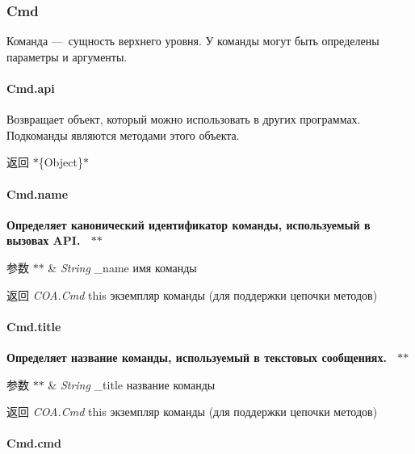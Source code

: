 \subsubsection*{Cmd}

Команда — сущность верхнего уровня. У команды могут быть определены параметры и аргументы.

\paragraph*{Cmd.\+api}

Возвращает объект, который можно использовать в других программах. Подкоманды являются методами этого объекта.~\newline
 {\bfseries \begin{DoxyReturn}{返回}
$\ast$\{Object\}$\ast$
\end{DoxyReturn}
\paragraph*{Cmd.\+name}}

{\bfseries  Определяет канонический идентификатор команды, используемый в вызовах A\+PI.~\newline
 $\ast$$\ast$
\begin{DoxyParams}{参数}
{\em $\ast$$\ast$} & {\itshape String} {\ttfamily \+\_\+name} имя команды~\newline
 {\bfseries }\\
\hline
\end{DoxyParams}
\begin{DoxyReturn}{返回}
{\bfseries } {\itshape C\+O\+A.\+Cmd} {\ttfamily this} экземпляр команды (для поддержки цепочки методов)
\end{DoxyReturn}
\paragraph*{Cmd.\+title}}

{\bfseries  Определяет название команды, используемый в текстовых сообщениях.~\newline
 $\ast$$\ast$
\begin{DoxyParams}{参数}
{\em $\ast$$\ast$} & {\itshape String} {\ttfamily \+\_\+title} название команды~\newline
 {\bfseries }\\
\hline
\end{DoxyParams}
\begin{DoxyReturn}{返回}
{\bfseries } {\itshape C\+O\+A.\+Cmd} {\ttfamily this} экземпляр команды (для поддержки цепочки методов)
\end{DoxyReturn}
\paragraph*{Cmd.\+cmd}}

